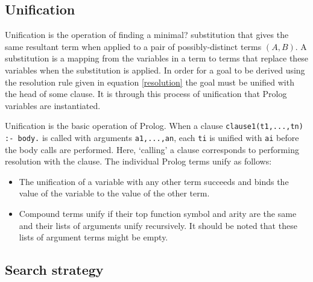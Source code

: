 \documentclass[12pt,a4paper]{report}
\begin{document}

 

\subsection{Unification}


Unification is the operation of finding a {\color{red} minimal?} substitution that gives the same resultant term when applied to a pair of possibly-distinct terms $(A,B)$. A substitution is a mapping from the variables in a term to terms that replace these variables when the substitution is applied. In order for a goal to be derived using the resolution rule given in equation \ref{resolution} the goal must be unified with the head of some clause. It is through this process of unification that Prolog variables are instantiated.

Unification is the basic operation of Prolog. When a clause \texttt{clause1(t1,...,tn) :- body.} is called with arguments \texttt{a1,...,an}, each \texttt{ti} is unified with \texttt{ai} before the body calls are performed. Here, `calling' a clause corresponds to performing resolution with the clause. The individual Prolog terms unify as follows:
\begin{itemize}

\item The unification of a variable with any other term succeeds and binds the value of the variable to the value of the other term. 

\item Compound terms unify if their top function symbol and arity are the same and their lists of arguments unify recursively. It should be noted that these lists of argument terms might be empty.


\end{itemize}

\subsection{Search strategy}
\end{document}
